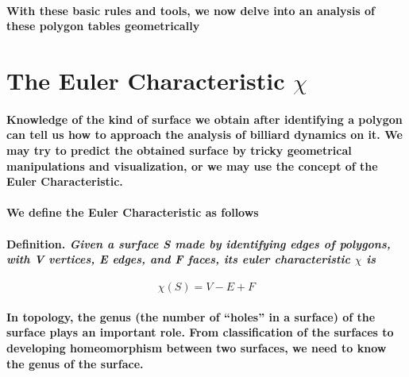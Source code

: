 \documentclass{report}
\begin{document}
\paragraph{With these basic rules and tools, we now delve into an analysis of these polygon tables geometrically}

\section{The Euler Characteristic $\chi$}

\paragraph{Knowledge of the kind of surface we obtain after identifying a polygon can tell us how to approach the analysis of billiard dynamics on it. We may try to predict the obtained surface by tricky geometrical manipulations and visualization, or we may use the concept of the Euler Characteristic.}

\paragraph{We define the Euler Characteristic as follows}

\paragraph{\textbf{Definition.} \textit{Given a surface \textit{S} made by identifying edges of polygons, with \textit{V} vertices, \textit{E} edges, and \textit{F} faces, its euler characteristic $\chi$ is}}

\begin{equation}
\mathit{\chi(S)=V-E+F}
\end{equation}

\paragraph{In topology, the genus (the number of “holes” in a surface) of the surface plays an important role. From classification of the surfaces to developing homeomorphism between two surfaces, we need to know the genus of the surface.\\}
\end{document}
